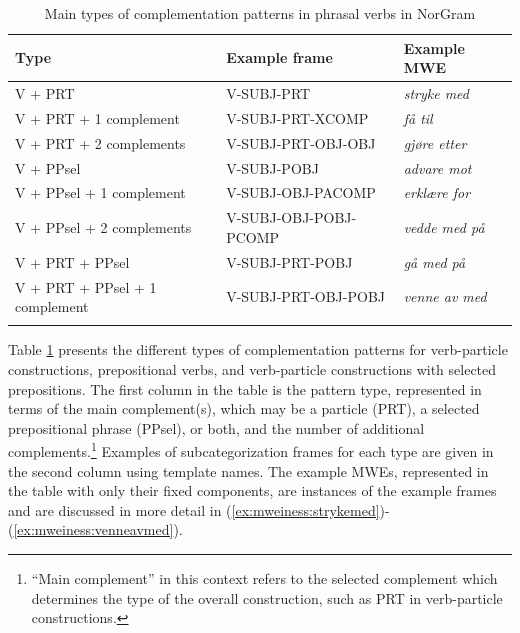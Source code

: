 \documentclass[output=paper]{langsci/langscibook}
\begin{document}
\begin{table}
  \begin{tabular}{l@{~}l@{~}l}
    \lsptoprule
    Type & Example frame & Example MWE \\
    \midrule
    V + PRT & V-SUBJ-PRT & \emph{stryke med} \\
    V + PRT + 1 complement & V-SUBJ-PRT-XCOMP & \emph{få til} \\
    V + PRT + 2 complements & V-SUBJ-PRT-OBJ-OBJ & \emph{gjøre etter}\\     \hline
    V + PPsel & V-SUBJ-POBJ & \emph{advare mot} \\
    V + PPsel + 1 complement  & V-SUBJ-OBJ-PACOMP & \emph{erklære for} \\
    V + PPsel + 2 complements & V-SUBJ-OBJ-POBJ-PCOMP & \emph{vedde med på} \\ \hline
    V + PRT + PPsel & V-SUBJ-PRT-POBJ & \emph{gå med på} \\
    V + PRT + PPsel + 1 complement & V-SUBJ-PRT-OBJ-POBJ & \emph{venne av med} \\ %
    \lspbottomrule
  \end{tabular}
  \caption{Main types of complementation patterns in phrasal verbs in NorGram}
  \label{tab:mweiness:phrasaltypes}
\end{table}

Table \ref{tab:mweiness:phrasaltypes} presents the different types of complementation patterns for verb-particle constructions, prepositional verbs, and verb-particle constructions with selected prepositions.
The first column in the table is the pattern type, represented in terms of the main complement(s), which may be a particle (PRT), a selected prepositional phrase (PPsel), or both, and the number of additional complements.\footnote{``Main complement'' in this context refers to the selected complement which determines the type of the overall construction, such as PRT in verb-particle constructions.} 
Examples of subcategorization frames for each type are given in the second column using template names.
The example MWEs, represented in the table with only their fixed components, are instances of the example frames and are discussed in more detail in (\ref{ex:mweiness:strykemed})-(\ref{ex:mweiness:venneavmed}).
\end{document}
